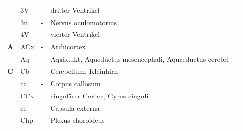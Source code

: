 \documentclass[12pt,a4paper,pdftex]{article}
\begin{document}

\begin{table}[H]
\begin{tabular}{llcll}
           & 3V  & - & dritter Ventrikel                                                       & \multicolumn{1}{c}{\textbf{}} \\
\textbf{}  & 3n  & -          & Nervus oculomotorius                                                        & \multicolumn{1}{c}{}          \\
\textbf{}  & 4V  & -          & vierter Ventrikel                                                       & \multicolumn{1}{c}{}          \\
\textbf{A} & ACx & -          & Archicortex                                                             & \multicolumn{1}{c}{}          \\
\textbf{}  & Aq  & -          & Aquädukt, Aqueductus mesencephali, Aquaeductus cerebri                  & \multicolumn{1}{c}{}          \\
\textbf{C} & Cb  & - & Cerebellum, Kleinhirn                                                   & \multicolumn{1}{c}{\textbf{}} \\
           & cc  & - & Corpus callosum                                                         & \multicolumn{1}{c}{\textbf{}} \\
\textbf{}  & CCx & -          & cingulärer Cortex, Gyrus cinguli             & \multicolumn{1}{c}{}          \\
\textbf{}  & ce  & -          & Capsula externa                                                         & \multicolumn{1}{c}{}          \\
\textbf{}  & Chp & -          & Plexus choroideus                                                          & \multicolumn{1}{c}{}          \\

\end{tabular}
\end{table}
\end{document}
